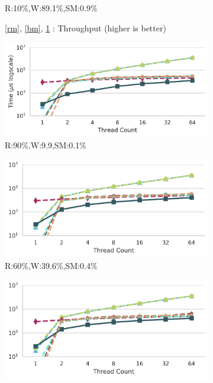 \begin{figure}[h]
\begin{subfigure}[b]{.325\textwidth}
			\caption{R:10\%,W:89.1\%,SM:0.9\%}
			\label{wm}
		\end{subfigure}
		\begin{subfigure}[b]{\textwidth}
			\caption*{\ref{rm}, \ref{bm}, \ref{wm} : Throughput (higher is better)}
		\end{subfigure}
	
	
	
		\begin{subfigure}[b]{.33\textwidth}
			\includegraphics[width=\textwidth]{figures/PerformanceCharts/ReadWithModificationsIdleness}
			\caption{R:90\%,W:9.9,SM:0.1\%}
			\label{irm}
		\end{subfigure}
		\begin{subfigure}[b]{.325\textwidth}
			\includegraphics[width=\textwidth]{figures/PerformanceCharts/BalancedWithModificationsIdleness}
			\caption{R:60\%,W:39.6\%,SM:0.4\%}
			\label{ibm}
		\end{subfigure}
		\begin{subfigure}[b]{.325\textwidth}
			\includegraphics[width=\textwidth]{figures/PerformanceCharts/WriteWithModificationsIdleness}

\end{subfigure}
\end{figure}
